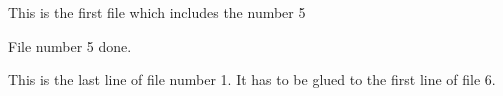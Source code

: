 This is the first file which includes the number 5


File number 5 done. 

This is the last line of file number 1. It has to be glued to the first line of file 6.
